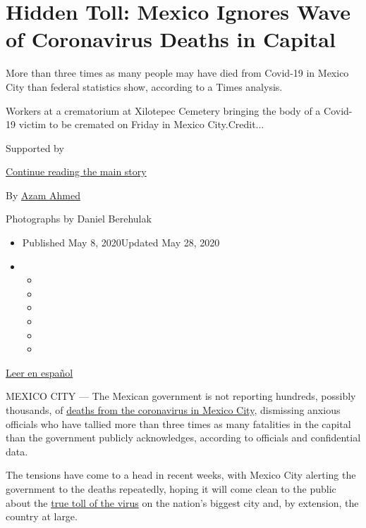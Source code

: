 \hypertarget{hidden-toll-mexico-ignores-wave-of-coronavirus-deaths-in-capital}{%
\section{Hidden Toll: Mexico Ignores Wave of Coronavirus Deaths in
Capital}\label{hidden-toll-mexico-ignores-wave-of-coronavirus-deaths-in-capital}}

More than three times as many people may have died from Covid-19 in
Mexico City than federal statistics show, according to a Times analysis.

Workers at a crematorium at Xilotepec Cemetery bringing the body of a
Covid-19 victim to be cremated on Friday in Mexico City.Credit...

Supported by

\protect\hyperlink{after-sponsor}{Continue reading the main story}

By \href{https://www.nytimes.com/by/azam-ahmed}{Azam Ahmed}

Photographs by Daniel Berehulak

\begin{itemize}
\item
  Published May 8, 2020Updated May 28, 2020
\item
  \begin{itemize}
  \item
  \item
  \item
  \item
  \item
  \item
  \end{itemize}
\end{itemize}

\href{https://www.nytimes.com/es/2020/05/08/espanol/america-latina/mexico-coronavirus.html}{Leer
en español}

MEXICO CITY --- The Mexican government is not reporting hundreds,
possibly thousands, of
\href{https://www.nytimes.com/2020/04/30/world/americas/coronavirus-mexico-factories.html}{deaths
from the coronavirus in Mexico City}, dismissing anxious officials who
have tallied more than three times as many fatalities in the capital
than the government publicly acknowledges, according to officials and
confidential data.

The tensions have come to a head in recent weeks, with Mexico City
alerting the government to the deaths repeatedly, hoping it will come
clean to the public about the
\href{https://www.nytimes.com/interactive/2020/world/coronavirus-maps.html}{true
toll of the virus} on the nation's biggest city and, by extension, the
country at large.

